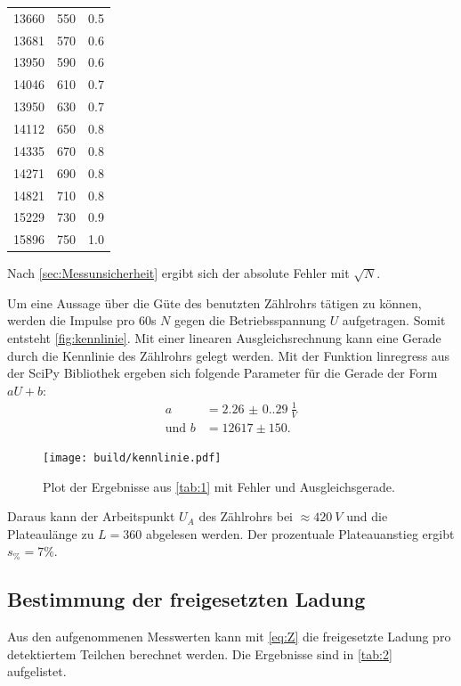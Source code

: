 \begin{table}[H]
\begin{tabular}{c c c}
      13660 & 550 & 0.5\\
      13681 & 570 & 0.6\\
      13950 & 590 & 0.6\\
      14046 & 610 & 0.7\\
      13950 & 630 & 0.7\\
      14112 & 650 & 0.8\\
      14335 & 670 & 0.8\\
      14271 & 690 & 0.8\\
      14821 & 710 & 0.8\\
      15229 & 730 & 0.9\\
      15896 & 750 & 1.0\\
      \bottomrule
  \end{tabular}
  \label{tab:1}
\end{table}

Nach \autoref{sec:Messunsicherheit} ergibt sich der absolute Fehler mit $\sqrt{N}$.

Um eine Aussage über die Güte des benutzten Zählrohrs tätigen zu können, werden die Impulse pro 60s $N$ gegen die
Betriebsspannung $U$ aufgetragen. Somit entsteht \autoref{fig:kennlinie}.
Mit einer linearen Ausgleichsrechnung kann eine Gerade durch die Kennlinie des Zählrohrs gelegt werden.
Mit der Funktion linregress aus der SciPy Bibliothek \cite{scipy} ergeben sich folgende Parameter für die Gerade der Form $aU + b$:
\begin{align*}
  a &= \SI{2.26(0.29)}{\frac{1}{V}}\\
  \text{und } b &= 12617 \pm 150.
\end{align*}

\begin{figure}[H]
  \texttt{[image: build/kennlinie.pdf]}
  \caption{Plot der Ergebnisse aus \autoref{tab:1} mit Fehler und Ausgleichsgerade.}
  \label{fig:kennlinie}
\end{figure}

Daraus kann der Arbeitspunkt $U_A$ des Zählrohrs bei $\approx \SI{420}{V}$ und die Plateaulänge zu $L = 360$ abgelesen werden.
Der prozentuale Plateauanstieg ergibt $s_{\%} = 7\%$.

\subsection{Bestimmung der freigesetzten Ladung}
Aus den aufgenommenen Messwerten kann mit \autoref{eq:Z} die freigesetzte Ladung pro detektiertem Teilchen berechnet werden.
Die Ergebnisse sind in \autoref{tab:2} aufgelistet.

